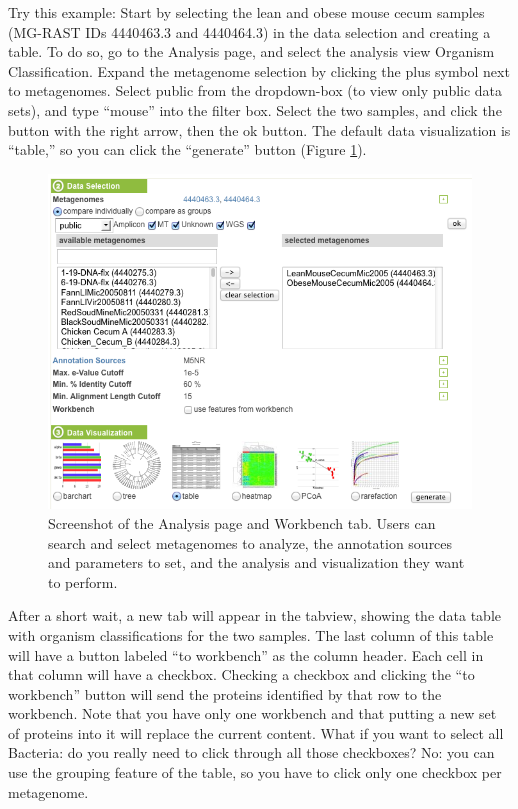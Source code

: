 \documentclass[12pt,fullpage]{report}
\begin{document}
Try this example: Start by selecting the lean and obese mouse cecum samples (MG-RAST IDs 4440463.3 and 4440464.3) \cite{OBESEMICE} in the data selection and creating a table. To do so, go to the Analysis page, and select the analysis view Organism Classification. Expand the metagenome selection by clicking the plus symbol next to metagenomes. Select public from the dropdown-box (to view only public data sets), and type ``mouse'' into the filter box. Select the two samples, and click the button with the right arrow, then the ok button. The default data visualization is ``table,'' so you can click the ``generate'' button (Figure \ref{fig:analysis-page-selecting-lean-and-obese}).

\begin{figure}
\begin{center}
\includegraphics[width=6in]{Images/analysis-page-selecting-lean-and-obese.png}
\end{center}
\caption{
Screenshot of the Analysis page and Workbench tab. Users can search and select metagenomes to analyze, the annotation sources and parameters to set, and the analysis and visualization they want to perform.
}
\label{fig:analysis-page-selecting-lean-and-obese}
\end{figure}

After a short wait, a new tab will appear in the tabview, showing the data table with organism classifications for the two samples. The last column of this table will have a button labeled ``to workbench'' as the column header. Each cell in that column will have a checkbox. Checking a checkbox and clicking the ``to workbench'' button will send the proteins identified by that row to the workbench.
Note that you have only one workbench and that putting a new set of proteins into it will replace the current content. What if you want to select all Bacteria: do you really need to click through all those checkboxes? No: you can use the grouping feature of the table, so you have to click only one checkbox per metagenome.
\end{document}

